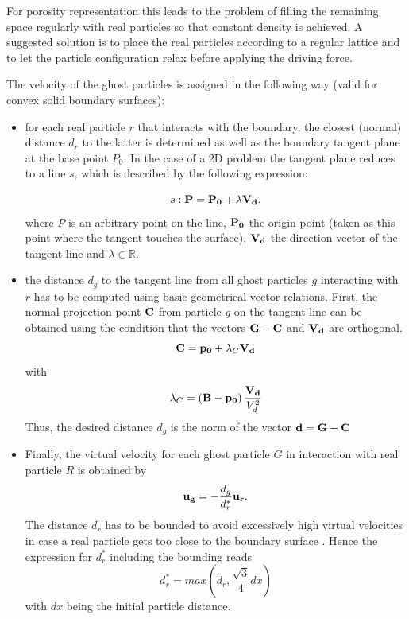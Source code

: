 \documentclass[11pt,a4paper,twoside]{report}
\begin{document}
\begin{itemize}
For porosity representation this leads to the problem of filling the remaining space regularly with real particles so that constant density is achieved. A suggested solution \cite{Morris1997} is to place the real particles according to a regular lattice and to let the particle configuration relax before applying the driving force. %

The velocity of the ghost particles is assigned in the following way \cite{Zhu1999} (valid for convex solid boundary surfaces): 
\begin{itemize}
\item for each real particle $r$ that interacts with the boundary, the closest (normal) distance $d_r$ to the latter is determined as well as the boundary tangent plane at the base point $P_0$. In the case of a 2D problem the tangent plane reduces to a line $s$, which is described by the following expression:

\begin{equation}
 \label{eq:BoundaryTangentEquation}
s: {\bf P}={\bf P_0}+\lambda {\bf V_d}.
\end{equation}
where $P$ is an arbitrary point on the line, ${\bf P_0}$ the origin point (taken as this point where the tangent touches the surface), ${\bf V_d}$ the direction vector of the tangent line and $\lambda \in \mathbb{R}$.
\item the distance $d_g$ to the tangent line from all ghost particles $g$ interacting with $r$ has to be computed using basic geometrical vector relations. First, the normal projection point ${\bf C}$ from particle $g$ on the tangent line can be obtained using the condition that the vectors ${\bf G}-{\bf C}$ and ${\bf V_d}$ are orthogonal.
\begin{equation}
 {\bf C}={\bf p_0}+\lambda_C {\bf V_d}
\end{equation}
with 
\begin{equation}
 \lambda_C=\left({\bf B}-{\bf p_0}\right)\frac{{\bf V_d}}{V_d^2}
\end{equation}
  Thus, the desired distance $d_g$ is the norm of the vector ${\bf d}={\bf G}-{\bf C}$
\item Finally, the virtual velocity for each ghost particle $G$ in interaction with real particle $R$ is obtained by
\begin{equation}
\label{eq:velocInterpolation}
 {\bf u_g}=-\frac{d_g}{d_r^*} {\bf u_r}.
\end{equation}
The distance $d_r$ has to be bounded to avoid excessively high virtual velocities in case a real particle gets too close to the boundary surface \cite{Zhu1999}. Hence the expression for $d_r^*$ including the bounding reads
\begin{equation}
 d_r^*=\mathit{max}\left(d_r,\frac{\sqrt{3}}{4}dx\right)
\end{equation}
with $dx$ being the initial particle distance.



\end{itemize}
\end{itemize}
\end{document}
